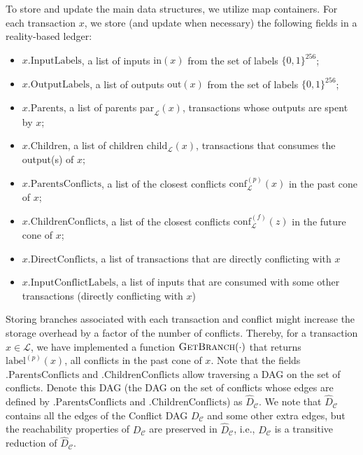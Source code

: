 \documentclass[11pt]{article}
\newcommand{\inputs}{\mathrm{in}}
\newcommand{\outputs}{\mathrm{out}}
\newcommand{\lab}{\mathrm{label}}
\newcommand{\conflictset}{\mathcal{C}}
\newcommand{\ledger}{\mathcal{L}}
\newcommand{\ConflictDAG}{D_{\conflictset}}
\newcommand{\parent}[2]{\mathrm{par}_{#1}\left(#2\right)}
\newcommand{\child}[2]{\mathrm{child}_{#1}\left(#2\right)}
\newcommand{\conflictsInCone}[3]{\mathrm{conf}^{(#1)}_{#2}\left(#3\right)}
\theoremstyle{plain}
\theoremstyle{definition}
\numberwithin{definition}{section}
\numberwithin{lemma}{section}
\numberwithin{ass}{section}
\numberwithin{remark}{section}
\numberwithin{example}{section}
\numberwithin{proposition}{section}
\numberwithin{theorem}{section}
\begin{document}
To store and update the main data structures, we utilize map containers. For each transaction $x$, we store (and update when necessary) the following fields in a reality-based ledger:
\begin{itemize}
    \item $x.\mathrm{InputLabels}$, a list of inputs $\inputs(x)$ from the set of labels $\{0,1\}^{256}$; 
    \item $x.\mathrm{OutputLabels}$, a list of outputs $\outputs(x)$ from the set of labels $\{0,1\}^{256}$; 
    \item $x.\mathrm{Parents}$, a list of parents $\parent{\ledger}{x}$, transactions whose outputs are spent by $x$;
    \item $x\mathrm{.Children}$, a list of children $\child{\ledger}{x}$, transactions that consumes the output(s) of $x$;  
    \item $x.\mathrm{ParentsConflicts}$, a list of the closest conflicts $\conflictsInCone{p}{\ledger}{x}$ in the past cone of $x$; 
    \item $x.\mathrm{ChildrenConflicts}$, a list of the closest conflicts $\conflictsInCone{f}{\ledger}{z}$ in the future cone of $x$;  
    \item $x.\mathrm{DirectConflicts}$, a list of transactions that are directly conflicting with $x$
    \item $x.\mathrm{InputConflictLabels}$, a list of inputs that are consumed with some other transactions (directly conflicting with $x$)
\end{itemize}

Storing branches associated with each transaction and conflict might increase the storage overhead by a factor of the number of conflicts. Thereby, for a transaction $x\in\ledger$, we have implemented a function $\textsc{GetBranch}(\cdot)$ that returns $\lab^{(p)}(x)$, all conflicts in the past cone of $x$. Note that the fields  $\mathrm{.ParentsConflicts}$ and $.\mathrm{ChildrenConflicts}$ allow traversing a DAG on the set of conflicts. Denote this DAG (the DAG on the set of conflicts whose edges are defined by $\mathrm{.ParentsConflicts}$ and $.\mathrm{ChildrenConflicts}$) as $\hat{D}_{\conflictset}$. We note that $\hat{D}_{\conflictset}$ contains all the edges of the Conflict DAG $\ConflictDAG$ and some other extra edges, but the reachability properties of $\ConflictDAG$ are preserved in $\hat{D}_{\conflictset}$, i.e., $\ConflictDAG$ is a transitive reduction of $\hat{D}_{\conflictset}$. 
 
\end{document}
